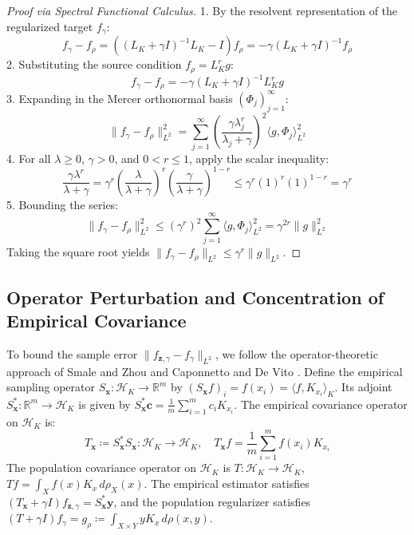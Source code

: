 \documentclass[11pt,a4paper]{article}
\theoremstyle{definition}
\begin{document}
\begin{proof}[Proof via Spectral Functional Calculus]
1. By the resolvent representation of the regularized target $f_\gamma$:
\[
f_\gamma - f_\rho = ((L_K + \gamma I)^{-1} L_K - I) f_\rho = -\gamma (L_K + \gamma I)^{-1} f_\rho
\]
2. Substituting the source condition $f_\rho = L_K^r g$:
\[
f_\gamma - f_\rho = -\gamma (L_K + \gamma I)^{-1} L_K^r g
\]
3. Expanding in the Mercer orthonormal basis $(\Phi_j)_{j=1}^\infty$:
\[
\|f_\gamma - f_\rho\|_{L^2}^2 = \sum_{j=1}^\infty \left( \frac{\gamma \lambda_j^r}{\lambda_j + \gamma} \right)^2 \langle g, \Phi_j \rangle_{L^2}^2
\]
4. For all $\lambda \ge 0$, $\gamma > 0$, and $0 < r \le 1$, apply the scalar inequality:
\[
\frac{\gamma \lambda^r}{\lambda + \gamma} = \gamma^r \left( \frac{\lambda}{\lambda + \gamma} \right)^r \left( \frac{\gamma}{\lambda + \gamma} \right)^{1-r} \le \gamma^r (1)^r (1)^{1-r} = \gamma^r
\]
5. Bounding the series:
\[
\|f_\gamma - f_\rho\|_{L^2}^2 \le (\gamma^r)^2 \sum_{j=1}^\infty \langle g, \Phi_j \rangle_{L^2}^2 = \gamma^{2r} \|g\|_{L^2}^2
\]
Taking the square root yields $\|f_\gamma - f_\rho\|_{L^2} \le \gamma^r \|g\|_{L^2}$.
\end{proof}

\subsection{Operator Perturbation and Concentration of Empirical Covariance}

To bound the sample error $\|f_{\mathbf{z}, \gamma} - f_\gamma\|_{L^2}$, we follow the operator-theoretic approach of Smale and Zhou \cite{smale2007} and Caponnetto and De Vito \cite{caponnetto2007}.
Define the empirical sampling operator $S_{\mathbf{x}}: \mathcal{H}_K \to \mathbb{R}^m$ by $(S_{\mathbf{x}} f)_i = f(x_i) = \langle f, K_{x_i} \rangle_K$. Its adjoint $S_{\mathbf{x}}^*: \mathbb{R}^m \to \mathcal{H}_K$ is given by $S_{\mathbf{x}}^* \mathbf{c} = \frac{1}{m} \sum_{i=1}^m c_i K_{x_i}$.
The empirical covariance operator on $\mathcal{H}_K$ is:
\begin{equation}\label{eq:empirical_cov}
T_{\mathbf{x}} \coloneqq S_{\mathbf{x}}^* S_{\mathbf{x}}: \mathcal{H}_K \to \mathcal{H}_K, \quad T_{\mathbf{x}} f = \frac{1}{m} \sum_{i=1}^m f(x_i) K_{x_i}
\end{equation}
The population covariance operator on $\mathcal{H}_K$ is $T: \mathcal{H}_K \to \mathcal{H}_K$, $T f = \int_X f(x) K_x \, d\rho_X(x)$.
The empirical estimator satisfies $(T_{\mathbf{x}} + \gamma I) f_{\mathbf{z}, \gamma} = S_{\mathbf{x}}^* \mathbf{y}$, and the population regularizer satisfies $(T + \gamma I) f_\gamma = g_\rho \coloneqq \int_{X \times Y} y K_x \, d\rho(x, y)$.
\end{document}
